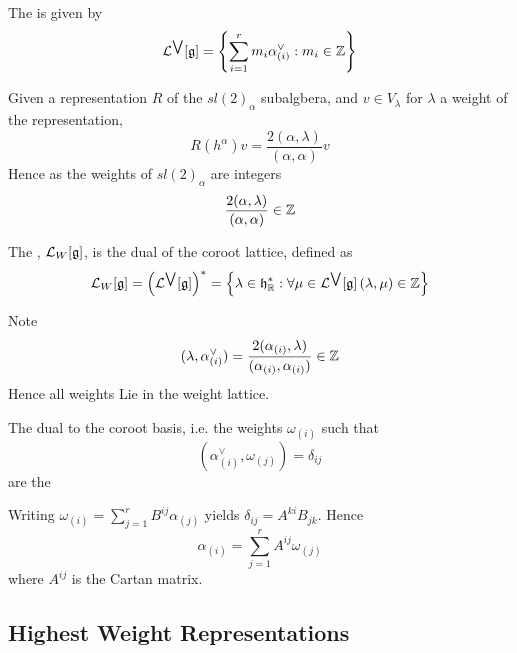\documentclass{article}
\begin{document}
\begin{definition}
	The  is given by 
	\[
	\mathcal{L}^{\bigvee} [\mathfrak{g}] =\left\{ \sum_{i=1}^r m_i \alpha^\vee_{(i)} : m_i \in\mathbb{Z} \right\}
	\]
\end{definition}

\begin{definition}
	Given a representation $R$ of the $sl(2)_\alpha$ subalgbera, and $v\in V_\lambda$ for $\lambda$ a weight of the representation,
	\[
	R(h^\alpha)v=\frac{2(\alpha,\lambda)}{(\alpha,\alpha)}v
	\]
	Hence as the weights of $sl(2)_\alpha$ are integers
	\[
	\frac{2(\alpha,\lambda)}{(\alpha,\alpha)} \in \mathbb{Z}
	\]
\end{definition}

\begin{definition}
	The , $\mathcal{L}_W [\mathfrak{g}]$, is the dual of the coroot lattice, defined as 
	\[
	\mathcal{L}_W [\mathfrak{g}] = \left( \mathcal{L}^{\bigvee} [\mathfrak{g}] \right)^\ast = \left\{ \lambda\in\mathfrak{h}^\ast_{\mathbb{R}} : \forall \mu\in\mathcal{L}^{\bigvee} [\mathfrak{g}] \, (\lambda, \mu) \in \mathbb{Z} \right\}
	\]
\end{definition}

\begin{theorem}
	Note 
	\[
	(\lambda, \alpha^\vee_{(i)})=\frac{2(\alpha_{(i)},\lambda)}{(\alpha_{(i)},\alpha_{(i)})} \in \mathbb{Z}
	\]
	Hence all weights Lie in the weight lattice. 
\end{theorem}



\begin{definition}
	The dual to the coroot basis, i.e. the weights $\omega_{(i)}$ such that 
	\[
	(\alpha^\vee_{(i)}, \omega_{(j)})=\delta_{ij}
	\]
	are the 
\end{definition}

\begin{fact}
	Writing $\omega_{(i)}=\sum_{j=1}^r B^{ij} \alpha_{(j)}$ yields $\delta_{ij}=A^{ki}B_{jk}$. Hence 
	\[
	\alpha_{(i)}=\sum_{j=1}^r A^{ij} \omega_{(j)}
	\]
	where $A^{ij}$ is the Cartan matrix. 
\end{fact}

\subsection{Highest Weight Representations}
\end{document}
